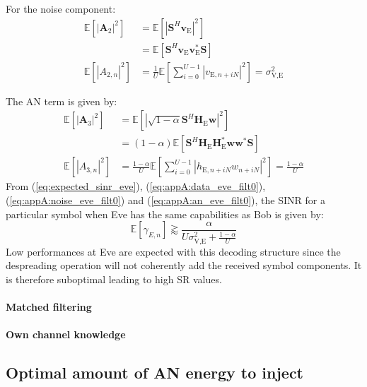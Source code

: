 \documentclass[journal,comsoc]{IEEEtran}
\newcommand{\module}[1]{\left|#1\right|}
\newcommand{\EX}[1]{\mathbb{E} \left[#1\right]}%
\newcommand{\HE}{\textbf{H}_{\text{E}}}
\newcommand{\ve}{\textbf{v}_{\text{E}}}
\newcommand{\spread}{\textbf{S}}
\newcommand{\w}{\textbf{w}}
\begin{document}
For the noise component:
\begin{equation}
	\begin{split}
	\EX{|\textbf{A}_{2}|^2} &=  \EX{\module{\spread^H \ve}^2} \\
	&=\EX{\spread^H \ve \ve^* \spread } \\
	\EX{|A_{2,n}|^2} &= \frac{1}{U} \EX{\sum_{i=0}^{U-1} |v_{\text{E}, n + iN}|^2} = \sigma^2_{\text{V,E}}
	\end{split}
	\label{eq:appA:noise_eve_filt0}
\end{equation}

The AN term is given by:
\begin{equation}
	\begin{split}
	\EX{|\textbf{A}_{3}|^2} &=  \EX{\module{\sqrt{1-\alpha}\spread^H \HE \w}^2} \\
	&=(1-\alpha)\EX{\spread^H \HE\textbf{H}^*_{\text{E}} \w\w^* \spread } \\
	\EX{|A_{3,n}|^2}  &= \frac{1-\alpha}{U} \EX{\sum_{i=0}^{U-1} |h_{\text{E}, n + iN}w_{n + iN}|^2} = \frac{1-\alpha}{U}
	\end{split}
	\label{eq:appA:an_eve_filt0}
\end{equation}
From (\ref{eq:expected_sinr_eve}), (\ref{eq:appA:data_eve_filt0}), (\ref{eq:appA:noise_eve_filt0}) and (\ref{eq:appA:an_eve_filt0}), the SINR for a particular symbol when Eve has the same capabilities as Bob is given by:
\begin{equation}
\EX{\gamma_{E,n}} \gtrapprox \frac{\alpha}{U\sigma^2_{\text{V,E}}+\frac{1-\alpha}{U}}
\label{eq:sinr_eve_filt0}
\end{equation}
Low performances at Eve are expected with this decoding structure since the despreading operation will not coherently add the received symbol components. It is therefore suboptimal leading to high SR values. 



\paragraph{Matched filtering}




\paragraph{Own channel knowledge}



\subsection{Optimal amount of AN energy to inject}
\end{document}
